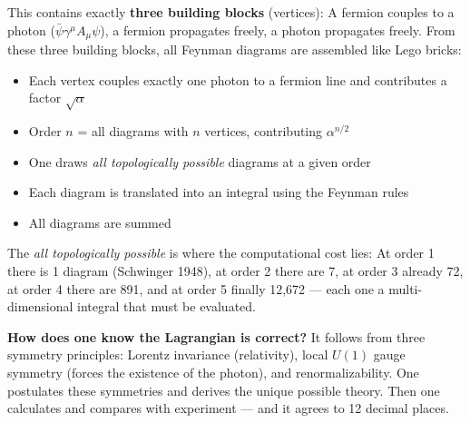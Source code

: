 This contains exactly \textbf{three building blocks} (vertices): A fermion couples to a photon ($\bar{\psi}\gamma^\mu A_\mu \psi$), a fermion propagates freely, a photon propagates freely. From these three building blocks, all Feynman diagrams are assembled like Lego bricks:

\begin{itemize}
	\item Each vertex couples exactly one photon to a fermion line and contributes a factor $\sqrt{\alpha}$
	\item Order $n$ = all diagrams with $n$ vertices, contributing $\alpha^{n/2}$
	\item One draws \textit{all topologically possible} diagrams at a given order
	\item Each diagram is translated into an integral using the Feynman rules
	\item All diagrams are summed
\end{itemize}

The \textit{all topologically possible} is where the computational cost lies: At order 1 there is 1 diagram (Schwinger 1948), at order 2 there are 7, at order 3 already 72, at order 4 there are 891, and at order 5 finally 12,672 --- each one a multi-dimensional integral that must be evaluated.

\begin{table}[h]
	\centering
	\caption{Growth of Feynman diagrams by order in QED}
	\label{tab:diagrams}
\end{table}

\textbf{How does one know the Lagrangian is correct?} It follows from three symmetry principles: Lorentz invariance (relativity), local $U(1)$ gauge symmetry (forces the existence of the photon), and renormalizability. One postulates these symmetries and derives the unique possible theory. Then one calculates and compares with experiment --- and it agrees to 12 decimal places.

